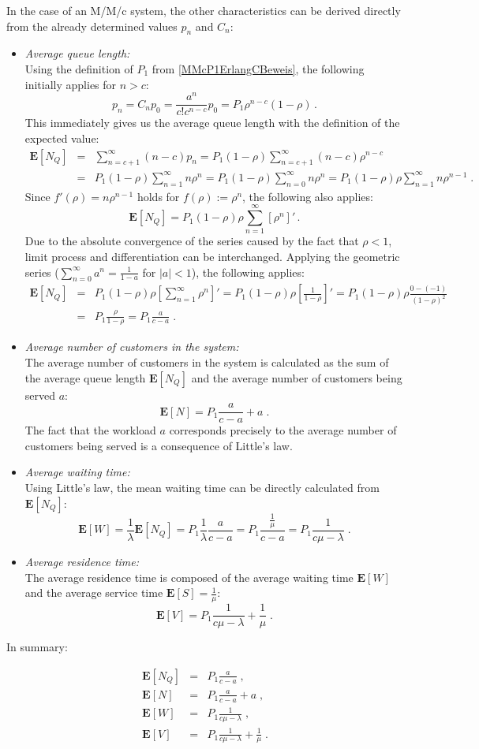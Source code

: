 \documentclass[a4paper,11pt,oneside]{article}
\theoremstyle{definition}
\begin{document}
In the case of an M/M/c system, the other characteristics can be derived directly from the already determined values $p_n$ and $C_n$:
\begin{itemize}
\item
\emph{Average queue length:}~\\
Using the definition of $P_1$ from \eqref{MMcP1ErlangCBeweis}, the following initially applies for $n>c$:
$$
p_n=C_np_0=\frac{a^n}{c!c^{n-c}}p_0=P_1\rho^{n-c}(1-\rho)\,.
$$
This immediately gives us the average queue length with the definition of the expected value:
\begin{eqnarray*}
\mathbf{E}[N_Q]&=&
\sum_{n=c+1}^\infty(n-c)p_n=
P_1(1-\rho)\sum_{n=c+1}^\infty(n-c)\rho^{n-c}\\&=&
P_1(1-\rho)\sum_{n=1}^\infty n\rho^n=
P_1(1-\rho)\sum_{n=0}^\infty n\rho^n=
P_1(1-\rho)\rho\sum_{n=1}^\infty n\rho^{n-1}\;.
\end{eqnarray*}
Since $f'(\rho)=n\rho^{n-1}$ holds for $f(\rho):=\rho^n$, the following also applies:
$$
\mathbf{E}[N_Q]=P_1(1-\rho)\rho\sum_{n=1}^\infty \left[\rho^n\right]'\,.
$$
Due to the absolute convergence of the series caused by the fact that $\rho<1$, limit process and differentiation can be interchanged. Applying the geometric series ($\sum_{n=0}^\infty a^n=\frac{1}{1-a}$ for $|a|<1$), the following applies:
\begin{eqnarray*}
\mathbf{E}[N_Q]&=&
P_1(1-\rho)\rho\left[\sum_{n=1}^\infty \rho^n\right]'=
P_1(1-\rho)\rho\left[\frac{1}{1-\rho}\right]'=
P_1(1-\rho)\rho\frac{0-(-1)}{(1-\rho)^2}\\&=&
P_1\frac{\rho}{1-\rho}=
P_1\frac{a}{c-a}\;.
\end{eqnarray*}
\item
\emph{Average number of customers in the system:}~\\
The average number of customers in the system is calculated as the sum of the average queue length $\mathbf{E}[N_Q]$ and the average number of customers being served $a$:
$$
\mathbf{E}[N]=P_1\frac{a}{c-a}+a\;.
$$
The fact that the workload $a$ corresponds precisely to the average number of customers being served is a consequence of Little's law.
\item
\emph{Average waiting time:}~\\
Using Little's law, the mean waiting time can be directly calculated from $\mathbf{E}[N_Q]$:
$$
\mathbf{E}[W]=
\frac{1}{\lambda}\mathbf{E}[N_Q]=
P_1\frac{1}{\lambda}\frac{a}{c-a}=
P_1\frac{\frac{1}{\mu}}{c-a}=
P_1\frac{1}{c\mu-\lambda}\;.
$$
\item
\emph{Average residence time:}~\\
The average residence time is composed of the average waiting time $\mathbf{E}[W]$ and the average service time $\mathbf{E}[S]=\frac{1}{\mu}$:
$$
\mathbf{E}[V]=P_1\frac{1}{c\mu-\lambda}+\frac{1}{\mu}\;.
$$
\end{itemize}

In summary:
\begin{tcolorbox}
\begin{eqnarray*}
\mathbf{E}[N_Q]&=&P_1\frac{a}{c-a}\;,\\
\mathbf{E}[N]&=&P_1\frac{a}{c-a}+a\;,\\
\mathbf{E}[W]&=&P_1\frac{1}{c\mu-\lambda}\;,\\
\mathbf{E}[V]&=&P_1\frac{1}{c\mu-\lambda}+\frac{1}{\mu}\;.
\end{eqnarray*}
\end{tcolorbox}
\end{document}
